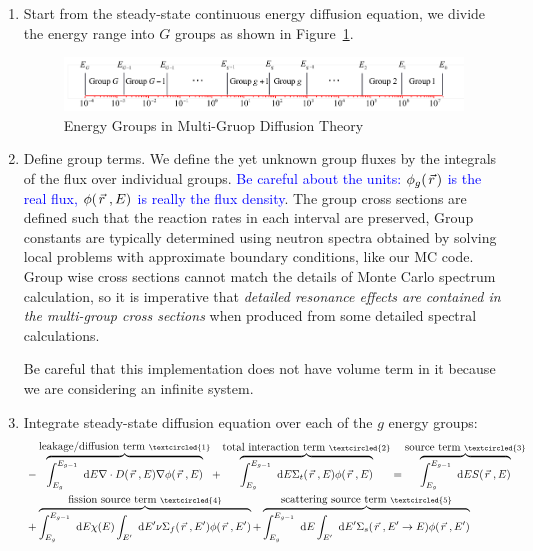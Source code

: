 \documentclass{school-22.211-notes}
\date{April 2, 2012}
\begin{document}
\maketitle

 \label{multi-group-diffusion}
\begin{enumerate}
\item Start from the steady-state continuous energy diffusion equation, we divide the energy range into $G$ groups as shown in Figure~\ref{energy-groups}. 
\begin{figure}[ht]
  \centering
  \includegraphics[width=6in]{images/dfs/energy-group.png}
  \caption{Energy Groups in Multi-Gruop Diffusion Theory} \label{energy-groups}
\end{figure}

\item Define group terms. We define the yet unknown group fluxes by the integrals of the flux over individual groups. \textcolor{blue}{Be careful about the units: $\phi_g(\left.\vec{r}\right.)$ is the real flux, $\phi(\left.\vec{r}\right., E)$ is really the flux density}. 
The group cross sections are defined such that the reaction rates in each interval are preserved,
Group constants are typically determined using neutron spectra obtained by solving local problems with approximate boundary conditions, like our MC code. Group wise cross sections cannot match the details of Monte Carlo spectrum calculation, so it is imperative that \textit{detailed resonance effects are contained in the multi-group cross sections} when produced from some detailed spectral calculations. 

Be careful that this implementation does not have volume term in it because we are considering an infinite system. 

\item Integrate steady-state diffusion equation over each of the $g$ energy groups: 
\begin{align}
& - \overbrace{\int_{E_g}^{E_{g-1}} \dE \divergence D(\vecr, E) \gradient \phi(\vecr, E)}^{\mbox{leakage/diffusion term }\textcircled{1}} + 
\overbrace{\int_{E_g}^{E_{g-1}} \dE \Sigma_t(\vecr, E) \phi(\vecr, E)}^{\mbox{total interaction term }\textcircled{2}} = \overbrace{\int_{E_g}^{E_{g-1}} \dE S(\vecr, E)}^{\mbox{source term } \textcircled{3}}  \\
& + \overbrace{\int_{E_g}^{E_{g-1}} \dE \chi(E) \int_{E'} \dE' \nu \Sigma_f (\vecr, E') \phi(\vecr, E')}^{\mbox{fission source term }\textcircled{4}} 
 + \overbrace{\int_{E_g}^{E_{g-1}} \dE \int_{E'} \dE' \Sigma_s(\vecr, E'\to E) \phi(\vecr, E')}^{\mbox{scattering source term }\textcircled{5}} 
\end{align}


\end{enumerate}
\end{document}
